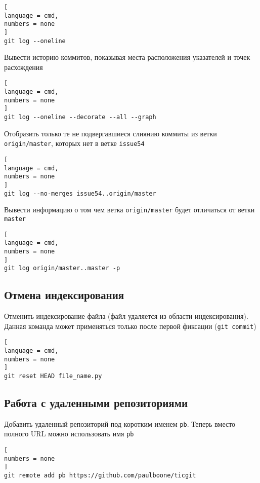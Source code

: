 \documentclass[%
	11pt,
	a4paper,
	utf8,
		]{article}
\begin{document}
\begin{lstlisting}[
language = cmd,
numbers = none
]
git log --oneline
\end{lstlisting}


Вывести историю коммитов, показывая места расположения указателей и точек расхождения

\begin{lstlisting}[
language = cmd,
numbers = none
]
git log --oneline --decorate --all --graph
\end{lstlisting}

Отобразить только те не подвергавшиеся слиянию коммиты из ветки \texttt{origin/master}, которых нет в ветке \texttt{issue54}

\begin{lstlisting}[
language = cmd,
numbers = none
]
git log --no-merges issue54..origin/master
\end{lstlisting}

Вывести информацию о том чем ветка \texttt{origin/master} будет отличаться от ветки \texttt{master}

\begin{lstlisting}[
language = cmd,
numbers = none
]
git log origin/master..master -p
\end{lstlisting}


\subsection{Отмена индексирования}

Отменить индексирование файла (файл удаляется из области индексирования). Данная команда может применяться только после первой фиксации (\texttt{git commit})

\begin{lstlisting}[
language = cmd,
numbers = none
]
git reset HEAD file_name.py
\end{lstlisting}


\subsection{Работа с удаленными репозиториями}

Добавить удаленный репозиторий под коротким именем \texttt{pb}. Теперь вместо полного URL можно использовать имя \texttt{pb}

\begin{lstlisting}[
numbers = none
]
git remote add pb https://github.com/paulboone/ticgit
\end{lstlisting}
\end{document}
